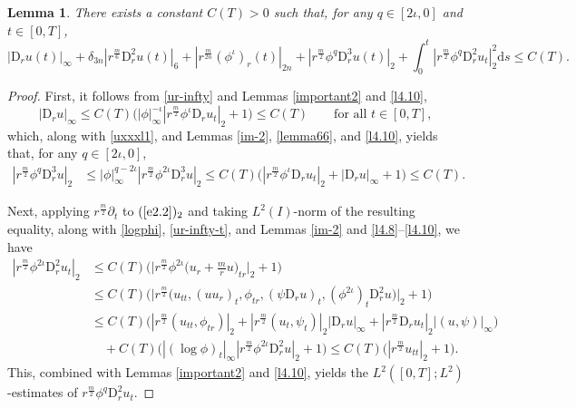 \documentclass[11pt,reqno]{amsart}
\newtheorem{lem}{Lemma}[section]
\numberwithin{rk}{section}
\numberwithin{prop}{section}
\numberwithin{mydef}{section}
\numberwithin{lem}{section}
\numberwithin{equation}{section}
\numberwithin{thm}{section}
\begin{document}
\begin{lem}\label{l4.10-ell}  
There exists a constant $C(T)>0$ such that, for any $q\in [2\iota,0]$ and $t\in [0,T]$,
\begin{equation*}
|\mathrm{D}_r u(t)|_\infty\!+\!\delta_{3n}|r^\frac{m}{6}\mathrm{D}_r^2 u(t)|_{6}\!+\!|r^\frac{m}{2n}(\phi^\iota)_r(t)|_{2n}\!+\!|r^\frac{m}{2}\phi^q \mathrm{D}_r^3u(t)|_2\!+\!\int_{0}^{t} |r^\frac{m}{2}\phi^q\mathrm{D}_r^2u_t|_{2}^2 \mathrm{d}s\leq C(T).
\end{equation*}
\end{lem}
\begin{proof}
First, it follows from \eqref{ur-infty} and Lemmas \ref{important2} and \ref{l4.10},
\begin{equation}\label{ur-infty-t}
|\mathrm{D}_r u|_\infty\leq C(T) \big(|\phi|_\infty^{-\iota}|r^\frac{m}{2} \phi^\iota\mathrm{D}_r u_t|_2+ 1\big)\leq C(T)\qquad \text{for all $t\in [0,T]$},
\end{equation}
which, along with \eqref{uxxxl1}, and Lemmas \ref{im-2}, \ref{lemma66}, and \ref{l4.10}, yields that, for any $q\in [2\iota,0]$,
\begin{equation}\label{3333}
\begin{aligned}
|r^\frac{m}{2}\phi^q \mathrm{D}_r^3u|_{2} &\leq |\phi|_\infty^{q-2\iota}|r^\frac{m}{2}\phi^{2\iota}\mathrm{D}_r^3u|_{2}\leq C(T)\big(|r^{\frac{m}{2}}\phi^\iota\mathrm{D}_r u_t|_{2}+|\mathrm{D}_r u|_\infty+1\big)\leq C(T).
\end{aligned}    
\end{equation}

Next, applying $r^\frac{m}{2}\partial_t$ to $(\ref{e2.2})_2$ and taking $L^2(I)$-norm of the resulting equality, along with \eqref{logphi}, \eqref{ur-infty-t}, and Lemmas \ref{im-2} and \ref{l4.8}--\ref{l4.10}, we have 
\begin{equation}\label{utt}
\begin{aligned}
|r^\frac{m}{2}\phi^{2\iota}\mathrm{D}_r^2u_t|_{2}&\leq C(T)\Big(\Big|r^\frac{m}{2}\phi^{2\iota}\big(u_r+ \frac{m}{r}u\big)_{tr}\Big|_2+1\Big)\\
&\leq C(T)\big(\big|r^{\frac{m}{2}}\big(u_{tt},(u u_r)_t,\phi_{tr},(\psi \mathrm{D}_r u)_t,(\phi^{2\iota})_t \mathrm{D}_r^2 u\big)\big|_2+1\big)\\
&\leq C(T)\big(|r^{\frac{m}{2}}(u_{tt},\phi_{tr})|_2 +|r^{\frac{m}{2}}(u_t,\psi_t)|_2|\mathrm{D}_r u|_\infty+|r^{\frac{m}{2}}\mathrm{D}_r u_t|_2|(u,\psi)|_\infty \big) \\
&\quad +C(T)\big(|(\log\phi)_t|_\infty |r^\frac{m}{2}\phi^{2\iota}\mathrm{D}_r^2 u|_2+1\big) \leq C(T)\big(|r^{\frac{m}{2}}u_{tt}|_2 +1\big).
 \end{aligned}
\end{equation}
This, combined with Lemmas \ref{important2} and \ref{l4.10}, yields the $L^2([0,T];L^2)$-estimates of $r^\frac{m}{2}\phi^{q}\mathrm{D}_r^2u_t$.


\end{proof}
\end{document}
